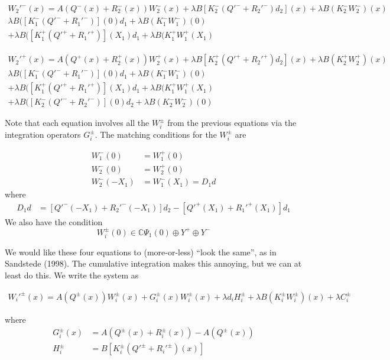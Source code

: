 \documentclass[12pt]{article}
\def\C{{\mathbb C}}
\begin{document}
\begin{multline}
W_2'^-(x) = A(Q^-(x) + R_2^-(x))W_2^-(x) + \lambda B [K_2^- (Q'^- + R_2'^-)d_2](x) + \lambda B (K_2^- W_2^-)(x)\\
  \lambda B ( [K_1^-(Q'^- + R_1'^-)](0) d_1 + \lambda B (K_1^- W_1^-)(0) \\
+ \lambda B ( [K_1^+(Q'^+ + R_1'^+)](X_1) d_1 + \lambda B (K_1^+ W_1^+(X_1)
\end{multline}

\begin{multline}
W_2'^+(x) = A(Q^+(x) + R_2^+(x))W_2^+(x) + \lambda B [K_2^+ (Q'^+ + R_2'^+)d_2](x) + \lambda B (K_2^+ W_2^+)(x)\\
  \lambda B ( [K_1^-(Q'^- + R_1'^-)](0) d_1 + \lambda B (K_1^- W_1^-)(0) \\
+ \lambda B ( [K_1^+(Q'^+ + R_1'^+)](X_1) d_1 + \lambda B (K_1^+ W_1^+(X_1) \\
+ \lambda B ( [K_2^-(Q'^- + R_2'^-)](0) d_2 + \lambda B (K_2^- W_2^-)(0)
\end{multline}

Note that each equation involves all the $W_i^\pm$ from the previous equations via the integration operators $G_i^\pm$. The matching conditions for the $W_i^\pm$ are

\begin{align*}
W_1^-(0) &= W_1^+(0) \\
W_2^-(0) &= W_2^+(0) \\
W_2^-(-X_1) &= W_1^-(X_1) = D_1 d
\end{align*}
where
\begin{align*}
D_1 d &= [Q'^-(-X_1) + R_2'^-(-X_1)]d_2 - [Q'^+(X_1) + R_1'^+(X_1)]d_1
\end{align*}
We also have the condition
\[
W_i^\pm(0) \in \C \Psi_1(0) \oplus Y^+ \oplus Y^-
\]

We would like these four equations to (more-or-less) ``look the same'', as in Sandstede (1998). The cumulative integration makes this annoying, but we can at least do this. We write the system as

\begin{align}\label{system}
W_i'^\pm(x) = A(Q^\pm(x))W_i^\pm(x) + G_i^\pm(x)W_i^\pm(x) + \lambda d_i H_i^\pm + \lambda B (K_i^\pm W_i^\pm)(x) + \lambda C_i^\pm
\end{align}

where
\begin{align*}
G_i^\pm(x) &= A(Q^\pm(x) + R_i^\pm(x)) - A(Q^\pm(x)) \\
H_i^\pm &= B[ K_i^\pm(Q'^\pm + R_i'^\pm)(x)]
\end{align*}
\end{document}
